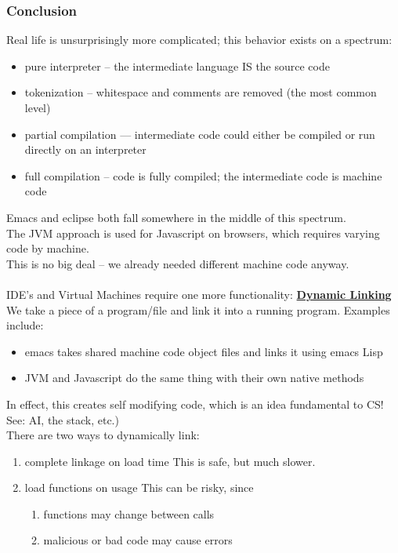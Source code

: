 \documentclass[../../lecture_notes.tex]{subfiles}
\begin{document}
\subsubsection*{Conclusion}
Real life is unsurprisingly more complicated; this behavior exists on a spectrum: 
	\begin{itemize} [itemsep=0mm]
		\item pure interpreter -- the intermediate language IS the source code
		\item tokenization -- whitespace and comments are removed (the most common level)
		\item partial compilation --- intermediate code could either be compiled or run directly on an interpreter
		\item full compilation -- code is fully compiled; the intermediate code is machine code
		\end{itemize}
Emacs and eclipse both fall somewhere in the middle of this spectrum.\\
The JVM approach is used for Javascript on browsers, which requires varying code by machine.\\
	\indent This is no big deal -- we already needed different machine code anyway.\\
\\
IDE's and Virtual Machines require one more functionality: \textbf{\underline{Dynamic Linking}}\\
\indent We take a piece of a program/file and link it into a running program. Examples include:\\
	\begin{itemize} [itemsep=0mm]
		\item emacs takes shared machine code object files and links it using emacs Lisp
		\item JVM and Javascript do the same thing with their own native methods
	\end{itemize}
In effect, this creates self modifying code, which is an idea fundamental to CS! See: AI, the stack, etc.)\\
There are two ways to dynamically link:
	\begin{enumerate} [itemsep=0mm]
		\item complete linkage on load time
			This is safe, but much slower.
		\item load functions on usage
			This can be risky, since
				\begin{enumerate} [itemsep=0mm]
					\item functions may change between calls
					\item malicious or bad code may cause errors
				\end{enumerate}
		\end{enumerate}
\end{document}
